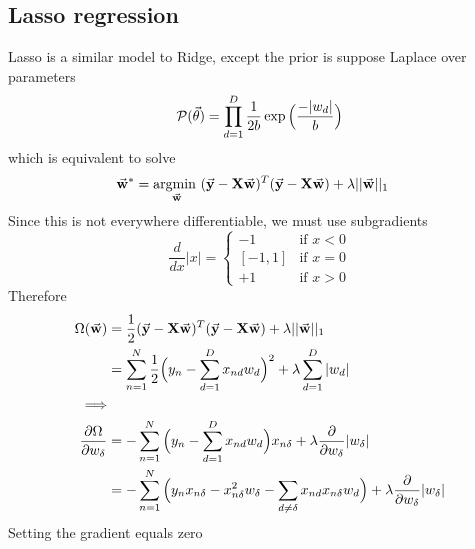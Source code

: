 \documentclass[../main.tex]{subfiles}
\begin{document}
\subsection{Lasso regression}
Lasso is a similar model to Ridge, except the prior is suppose Laplace over parameters
\begin{equation*}
    \p(\vec{\theta}) = \prod_{d=1}^D \frac{1}{2b}\exp\Big(\dfrac{-|w_d|}{b}\Big)
\end{equation*}
which is equivalent to solve
\begin{align*}
    \vec{w}^*
    &= \argmin_{\vec{w}} (\vec{y}-\mat{X}\vec{w})^T(\vec{y}-\mat{X}\vec{w}) + \lambda||\vec{w}||_1
\end{align*}
Since this is not everywhere differentiable, we must use subgradients
\begin{equation*}
    \frac{d}{dx}|x|=
\begin{cases}
        { -1 } & \text{if } x<0 \\
        [-1, 1] & \text{if } x=0 \\
        { +1 } & \text{if } x>0
    \end{cases}
\end{equation*}
Therefore
\begin{align*}
    \Omega(\vec{w})
    &= \frac{1}{2}(\vec{y}-\mat{X}\vec{w})^T(\vec{y}-\mat{X}\vec{w}) + \lambda||\vec{w}||_1\\
    &= \sum_{n=1}^N \frac{1}{2}\Big(y_n - \sum_{d=1}^D x_{nd}w_d\Big)^2 + \lambda \sum_{d=1}^D|w_d|\\
    \Longrightarrow&\\
    \dfrac{\partial\Omega}{\partial w_\delta}
    &= -\sum_{n=1}^N \Big(y_n - \sum_{d=1}^D x_{nd}w_d\Big)x_{n\delta} + \lambda \frac{\partial}{\partial w_\delta}|w_\delta|\\
    &= -\sum_{n=1}^N \Big(y_n x_{n\delta} - x_{n\delta}^2 w_\delta - \sum_{d\neq\delta} x_{nd}x_{n\delta}w_d\Big)+ \lambda \frac{\partial}{\partial w_\delta}|w_\delta|\\
\end{align*}
Setting the gradient equals zero
\end{document}
